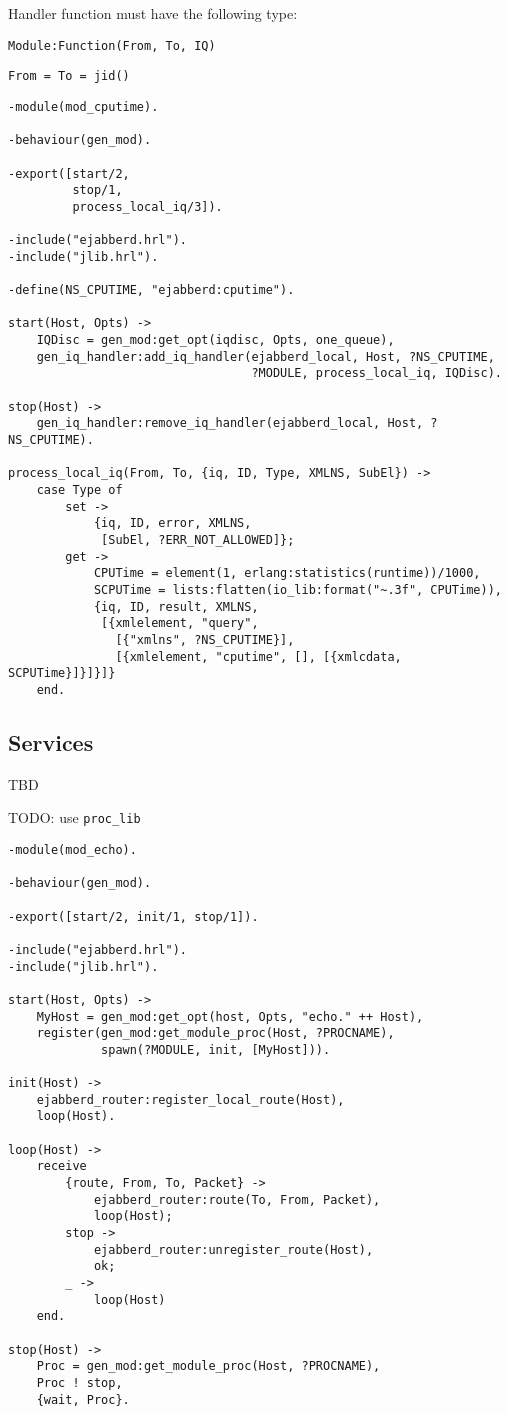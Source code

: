 \documentclass[a4paper,10pt]{article}
\begin{document}
Handler function must have the following type:
\begin{description}
\item{\verb|Module:Function(From, To, IQ)|}
\begin{verbatim}
From = To = jid()
\end{verbatim}
\end{description}



\begin{verbatim}
-module(mod_cputime).

-behaviour(gen_mod).

-export([start/2,
         stop/1,
         process_local_iq/3]).

-include("ejabberd.hrl").
-include("jlib.hrl").

-define(NS_CPUTIME, "ejabberd:cputime").

start(Host, Opts) ->
    IQDisc = gen_mod:get_opt(iqdisc, Opts, one_queue),
    gen_iq_handler:add_iq_handler(ejabberd_local, Host, ?NS_CPUTIME,
                                  ?MODULE, process_local_iq, IQDisc).

stop(Host) ->
    gen_iq_handler:remove_iq_handler(ejabberd_local, Host, ?NS_CPUTIME).

process_local_iq(From, To, {iq, ID, Type, XMLNS, SubEl}) ->
    case Type of
        set ->
            {iq, ID, error, XMLNS,
             [SubEl, ?ERR_NOT_ALLOWED]};
        get ->
            CPUTime = element(1, erlang:statistics(runtime))/1000,
            SCPUTime = lists:flatten(io_lib:format("~.3f", CPUTime)),
            {iq, ID, result, XMLNS,
             [{xmlelement, "query",
               [{"xmlns", ?NS_CPUTIME}],
               [{xmlelement, "cputime", [], [{xmlcdata, SCPUTime}]}]}]}
    end.
\end{verbatim}


\subsection{Services}
\label{sec:services}

TBD


TODO: use \verb|proc_lib|
\begin{verbatim}
-module(mod_echo).

-behaviour(gen_mod).

-export([start/2, init/1, stop/1]).

-include("ejabberd.hrl").
-include("jlib.hrl").

start(Host, Opts) ->
    MyHost = gen_mod:get_opt(host, Opts, "echo." ++ Host),
    register(gen_mod:get_module_proc(Host, ?PROCNAME),
             spawn(?MODULE, init, [MyHost])).

init(Host) ->
    ejabberd_router:register_local_route(Host),
    loop(Host).

loop(Host) ->
    receive
        {route, From, To, Packet} ->
            ejabberd_router:route(To, From, Packet),
            loop(Host);
        stop ->
            ejabberd_router:unregister_route(Host),
            ok;
        _ ->
            loop(Host)
    end.

stop(Host) ->
    Proc = gen_mod:get_module_proc(Host, ?PROCNAME),
    Proc ! stop,
    {wait, Proc}.
\end{verbatim}
\end{document}
